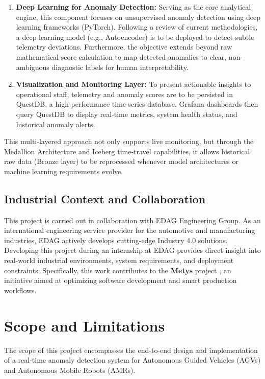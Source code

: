 \begin{enumerate}
    \item \textbf{Deep Learning for Anomaly Detection:} 
    Serving as the core analytical engine, this component focuses on unsupervised anomaly detection using deep learning frameworks (PyTorch). Following a review of current methodologies, a deep learning model (e.g., Autoencoder) is to be deployed to detect subtle telemetry deviations. Furthermore, the objective extends beyond raw mathematical score calculation to map detected anomalies to clear, non-ambiguous diagnostic labels for human interpretability.

    \item \textbf{Visualization and Monitoring Layer:} 
    To present actionable insights to operational staff, telemetry and anomaly scores are to be persisted in QuestDB\cite{questdb}, a high-performance time-series database. Grafana\cite{grafana} dashboards then query QuestDB to display real-time metrics, system health status, and historical anomaly alerts.
\end{enumerate}

This multi-layered approach not only supports live monitoring, but through the Medallion Architecture and Iceberg time-travel capabilities, it allows historical raw data (Bronze layer) to be reprocessed whenever model architectures or machine learning requirements evolve.

\subsection{Industrial Context and Collaboration}
This project is carried out in collaboration with EDAG Engineering Group. 
As an international engineering service provider for the automotive and manufacturing industries, EDAG actively develops cutting-edge Industry 4.0 solutions. 
Developing this project during an internship at EDAG provides direct insight into real-world industrial environments, system requirements, and deployment constraints. 
Specifically, this work contributes to the \textbf{Metys} project \cite{edagMetys}, an initiative aimed at optimizing software development and smart production workflows.

\section{Scope and Limitations}
The scope of this project encompasses the end-to-end design and implementation of a real-time anomaly detection system for Autonomous Guided Vehicles (AGVs) and Autonomous Mobile Robots (AMRs). 

